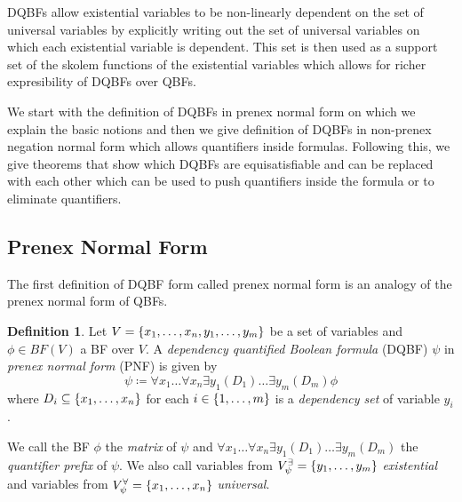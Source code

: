 \documentclass[
  digital, %
  twoside, %
  table,   %
  nolof,     %
  nolot,     %
]{fithesis3}
\let\setbuilder\set
\newcommand{\simpleset}[1]{\{{#1}\}}
\renewcommand{\set}[1]{\normalexpandarg\IfSubStr{#1}{|}{\setbuilder{#1}}{\simpleset{#1}}}
\theoremstyle{definition}
\newtheorem{definition}{Definition}
\theoremstyle{remark}
\newcommand{\BF}[1]{BF(#1)}
\newcommand{\evars}[1]{V_{#1}^{\exists}}
\newcommand{\uvars}[1]{V_{#1}^{\forall}}
\begin{document}
DQBFs allow existential variables to be non-linearly dependent on the set of universal variables by explicitly writing out the set of universal variables on which each existential variable is dependent. This set is then used as a support set of the skolem functions of the existential variables which allows for richer expresibility of DQBFs over QBFs.  

We start with the definition of DQBFs in prenex normal form on which we explain the basic notions and then we give definition of DQBFs in non-prenex negation normal form which allows quantifiers inside formulas. Following this, we give theorems that show which DQBFs are equisatisfiable and can be replaced with each other which can be used to push quantifiers inside the formula or to eliminate quantifiers.

\subsection{Prenex Normal Form}
The first definition of DQBF form called prenex normal form is an analogy of the prenex normal form of QBFs.


\begin{definition}
  Let $V = \set{x_1, \dots, x_n, y_1, \dots, y_m}$ be a set of variables and $\phi \in \BF{V}$ a BF over $V$. A \emph{dependency quantified Boolean formula} (DQBF) $\psi$ in \emph{prenex normal form} (PNF) is given by
  \[\psi \coloneqq \forall x_1 \dots \forall x_n \exists y_1 (D_1) \dots \exists y_m (D_m) \phi\]
  where $D_i \subseteq \set{x_1, \dots, x_n}$ for each $i \in \set{1,\dots,m}$ is a \emph{dependency set} of variable $y_i$.
  \label{def:DQBF:PNF}
\end{definition}
We call the BF $\phi$ the \emph{matrix} of $\psi$ and $\forall x_1 \dots \forall x_n \exists y_1 (D_1) \dots \exists y_m (D_m)$ the \emph{quantifier prefix} of $\psi$. We also call variables from $\evars{\psi} = \set{y_1,\dots,y_m}$ \emph{existential} and variables from $\uvars{\psi} = \set{x_1,\dots,x_n}$ \emph{universal}.
\end{document}
